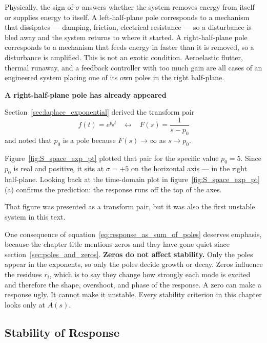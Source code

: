 \documentclass[12pt,letter]{article}
\begin{document}
Physically, the sign of $\sigma$ answers whether the system removes energy from itself or supplies energy to itself. A left-half-plane pole corresponds to a mechanism that dissipates --- damping, friction, electrical resistance --- so a disturbance is bled away and the system returns to where it started. A right-half-plane pole corresponds to a mechanism that feeds energy in faster than it is removed, so a disturbance is amplified. This is not an exotic condition. Aeroelastic flutter, thermal runaway, and a feedback controller with too much gain are all cases of an engineered system placing one of its own poles in the right half-plane.

\begin{review}
	\label{sec:rhp_pole_already_seen}
	\textbf{A right-half-plane pole has already appeared}

	Section~\ref{sec:laplace_exponential} derived the transform pair
	\begin{equation}
		f(t) = e^{p_0 t} \; \; \; \longleftrightarrow \; \; \; F(s) = \frac{1}{s-p_0}
	\end{equation}
	and noted that $p_0$ is a pole because $F(s) \rightarrow \infty$ as $s \rightarrow p_0$.

	Figure~\ref{fig:S_space_exp_pt} plotted that pair for the specific value $p_0 = 5$. Since $p_0$ is real and positive, it sits at $\sigma = +5$ on the horizontal axis --- in the right half-plane. Looking back at the time-domain plot in figure~\ref{fig:S_space_exp_pt}(a) confirms the prediction: the response runs off the top of the axes.

	That figure was presented as a transform pair, but it was also the first unstable system in this text.
\end{review}

One consequence of equation~\ref{eq:response_as_sum_of_poles} deserves emphasis, because the chapter title mentions zeros and they have gone quiet since section~\ref{sec:poles_and_zeros}. \textbf{Zeros do not affect stability.} Only the poles appear in the exponents, so only the poles decide growth or decay. Zeros influence the residues $r_i$, which is to say they change how strongly each mode is excited and therefore the shape, overshoot, and phase of the response. A zero can make a response ugly. It cannot make it unstable. Every stability criterion in this chapter looks only at $A(s)$.


\subsection{Stability of Response}
\label{sec:stability_of_response}
\end{document}
